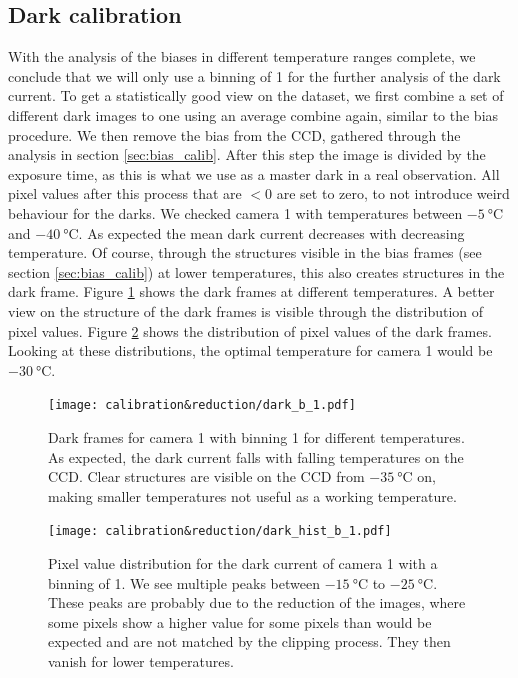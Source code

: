 \documentclass{article}
\begin{document}
\subsection{Dark calibration}
With the analysis of the biases in different temperature ranges complete, we conclude that we will only use a binning of 1 for the further analysis of the dark current. To get a statistically good view on the dataset, we first combine a set of different dark images to one using an average combine again, similar to the bias procedure. We then remove the bias from the CCD, gathered through the analysis in section \ref{sec:bias_calib}. After this step the image is divided by the exposure time, as this is what we use as a master dark in a real observation. All pixel values after this process that are $<0$ are set to zero, to not introduce weird behaviour for the darks.\newline
We checked camera 1 with temperatures between $\SI{-5}{\celsius}$ and $\SI{-40}{\celsius}$. As expected the mean dark current decreases with decreasing temperature. Of course, through the structures visible in the bias frames (see section \ref{sec:bias_calib}) at lower temperatures, this also creates structures in the dark frame. Figure \ref{fig:Dark_c1_calib} shows the dark frames at different temperatures. A better view on the structure of the dark frames is visible through the distribution of pixel values. Figure \ref{fig:Dark_c1_calib_hist} shows the distribution of pixel values of the dark frames. Looking at these distributions, the optimal temperature for camera 1 would be $\SI{-30}{\celsius}$.
\begin{figure}[H]
    \centering
    \texttt{[image: calibration\&reduction/dark\_b\_1.pdf]}
    \caption{Dark frames for camera 1 with binning 1 for different temperatures. As expected, the dark current falls with falling temperatures on the CCD. Clear structures are visible on the CCD from $\SI{-35}{\celsius}$ on, making smaller temperatures not useful as a working temperature.}
    \label{fig:Dark_c1_calib}
\end{figure}
\begin{figure}[H]
    \centering
    \texttt{[image: calibration\&reduction/dark\_hist\_b\_1.pdf]}
    \caption{Pixel value distribution for the dark current of camera 1 with a binning of 1. We see multiple peaks between $\SI{-15}{\celsius}$ to $\SI{-25}{\celsius}$. These peaks are probably due to the reduction of the images, where some pixels show a higher value for some pixels than would be expected and are not matched by the clipping process. They then vanish for lower temperatures.}
    \label{fig:Dark_c1_calib_hist}
\end{figure}
\end{document}

